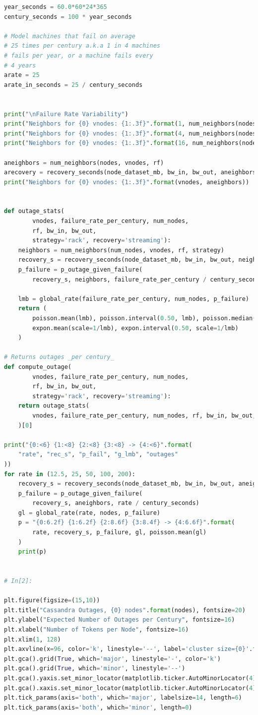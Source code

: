 \documentclass{article}
\begin{document}
\begin{lstlisting}[language=Python]
year_seconds = 60.0*60*24*365
century_seconds = 100 * year_seconds

# Model machines that fail on average
# 25 times per century a.k.a 1 in 4 machines
# fails per year, or a machine fails every
# 4 years
arate = 25
arate_in_seconds = 25 / century_seconds


print("\nFailure Rate Variability")
print("Neighbors for {0} vnodes: {1:.3f}".format(1, num_neighbors(nodes, 1, rf)))
print("Neighbors for {0} vnodes: {1:.3f}".format(4, num_neighbors(nodes, 4, rf)))
print("Neighbors for {0} vnodes: {1:.3f}".format(16, num_neighbors(nodes, 16, rf)))

aneighbors = num_neighbors(nodes, vnodes, rf)
arecovery = recovery_seconds(node_dataset_mb, bw_in, bw_out, aneighbors)
print("Neighbors for {0} vnodes: {1:.3f}".format(vnodes, aneighbors))


def outage_stats(
        vnodes, failure_rate_per_century, num_nodes,
        rf, bw_in, bw_out,
        strategy='rack', recovery='streaming'):
    neighbors = num_neighbors(num_nodes, vnodes, rf, strategy)
    recovery_s = recovery_seconds(node_dataset_mb, bw_in, bw_out, neighbors, recovery)
    p_failure = p_outage_given_failure(
        recovery_s, neighbors, failure_rate_per_century / century_seconds)

    lmb = global_rate(failure_rate_per_century, num_nodes, p_failure)
    return (
        poisson.mean(lmb), poisson.interval(0.50, lmb), poisson.median(lmb),
        expon.mean(scale=1/lmb), expon.interval(0.50, scale=1/lmb)
    )

# Returns outages _per century_
def compute_outage(
        vnodes, failure_rate_per_century, num_nodes,
        rf, bw_in, bw_out,
        strategy='rack', recovery='streaming'):
    return outage_stats(
        vnodes, failure_rate_per_century, num_nodes, rf, bw_in, bw_out, strategy
    )[0]

print("{0:<6} {1:<8} {2:<8} {3:<8} -> {4:<6}".format(
    "rate", "rec_s", "p_fail", "g_lmb", "outages"
))
for rate in (12.5, 25, 50, 100, 200):
    recovery_s = recovery_seconds(node_dataset_mb, bw_in, bw_out, aneighbors)
    p_failure = p_outage_given_failure(
        recovery_s, aneighbors, rate / century_seconds)
    gl = global_rate(rate, nodes, p_failure)
    p = "{0:6.2f} {1:6.2f} {2:8.6f} {3:8.4f} -> {4:6.6f}".format(
        rate, recovery_s, p_failure, gl, poisson.mean(gl)
    )
    print(p)


# In[2]:

plt.figure(figsize=(15,10))
plt.title("Cassandra Outages, {0} nodes".format(nodes), fontsize=20)
plt.ylabel("Expected Number of Outages per Century", fontsize=16)
plt.xlabel("Number of Tokens per Node", fontsize=16)
plt.xlim(1, 128)
plt.axvline(x=96, color='k', linestyle='--', label='cluster size={0}'.format(nodes))
plt.gca().grid(True, which='major', linestyle='-', color='k')
plt.gca().grid(True, which='minor', linestyle='--')
plt.gca().yaxis.set_minor_locator(matplotlib.ticker.AutoMinorLocator(4))
plt.gca().xaxis.set_minor_locator(matplotlib.ticker.AutoMinorLocator(4))
plt.tick_params(axis='both', which='major', labelsize=14, length=6)
plt.tick_params(axis='both', which='minor', length=0)


\end{lstlisting}
\end{document}
